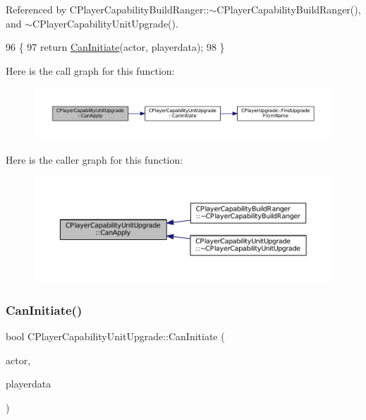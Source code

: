 Referenced by C\+Player\+Capability\+Build\+Ranger\+::$\sim$\+C\+Player\+Capability\+Build\+Ranger(), and $\sim$\+C\+Player\+Capability\+Unit\+Upgrade().


\begin{DoxyCode}
96                                                                                                            
                                                        \{
97     \textcolor{keywordflow}{return} \hyperlink{classCPlayerCapabilityUnitUpgrade_ad01fc5df598efea4063ac2bbf0ba34e9}{CanInitiate}(actor, playerdata);
98 \}
\end{DoxyCode}
Here is the call graph for this function\+:\nopagebreak
\begin{figure}[H]
\begin{center}
\leavevmode
\includegraphics[width=350pt]{classCPlayerCapabilityUnitUpgrade_a93d1a57f2cc52b90ce6cb714717bfefd_cgraph}
\end{center}
\end{figure}
Here is the caller graph for this function\+:\nopagebreak
\begin{figure}[H]
\begin{center}
\leavevmode
\includegraphics[width=350pt]{classCPlayerCapabilityUnitUpgrade_a93d1a57f2cc52b90ce6cb714717bfefd_icgraph}
\end{center}
\end{figure}
\hypertarget{classCPlayerCapabilityUnitUpgrade_ad01fc5df598efea4063ac2bbf0ba34e9}{}\label{classCPlayerCapabilityUnitUpgrade_ad01fc5df598efea4063ac2bbf0ba34e9} 
\subsubsection{\texorpdfstring{Can\+Initiate()}{CanInitiate()}}
{\footnotesize\ttfamily bool C\+Player\+Capability\+Unit\+Upgrade\+::\+Can\+Initiate (\begin{DoxyParamCaption}\item[{std\+::shared\+\_\+ptr$<$ \hyperlink{classCPlayerAsset}{C\+Player\+Asset} $>$}]{actor,  }\item[{std\+::shared\+\_\+ptr$<$ \hyperlink{classCPlayerData}{C\+Player\+Data} $>$}]{playerdata }\end{DoxyParamCaption})\hspace{0.3cm}{\ttfamily [virtual]}}



